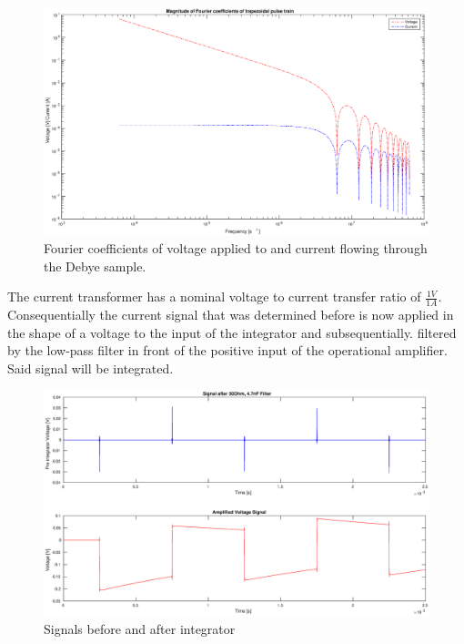 \begin{figure}[h!tb]
\centerline{\includegraphics[width=\textwidth]{figures/Method/signal_simulation/fourierla.eps}}
\caption{Fourier coefficients of voltage applied to and current flowing through the Debye sample.}
\label{fig.fourierla}
\end{figure}

The current transformer has a nominal voltage to current transfer ratio of $\frac{1V}{1A}$. 
Consequentially the current signal that was determined before is now applied in the shape of a voltage to the input of the integrator and subsequentially.
filtered by the low-pass filter in front of the positive input of the operational amplifier. Said signal will be integrated.


\begin{figure}[h!tb]
\centerline{\includegraphics[width=\textwidth]{figures/Method/signal_simulation/integrated.eps}}
\caption{Signals before and after integrator}
\label{fig.integrator}
\end{figure}

